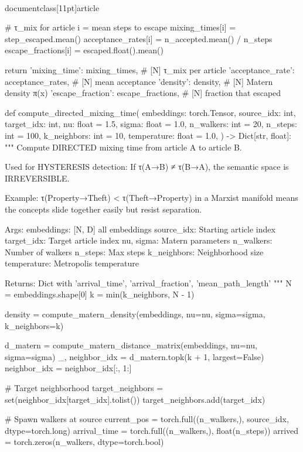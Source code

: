 \\documentclass[11pt]{article}
\begin{document}
\begin{CodeBlock}
        # τ_mix for article i = mean steps to escape
        mixing_times[i] = step_escaped.mean()
        acceptance_rates[i] = n_accepted.mean() / n_steps
        escape_fractions[i] = escaped.float().mean()

    return {
        'mixing_time': mixing_times,        # [N] τ_mix per article
        'acceptance_rate': acceptance_rates,  # [N] mean acceptance
        'density': density,                  # [N] Matern density π(x)
        'escape_fraction': escape_fractions, # [N] fraction that escaped
    }


def compute_directed_mixing_time(
    embeddings: torch.Tensor,
    source_idx: int,
    target_idx: int,
    nu: float = 1.5,
    sigma: float = 1.0,
    n_walkers: int = 20,
    n_steps: int = 100,
    k_neighbors: int = 10,
    temperature: float = 1.0,
) -> Dict[str, float]:
    """
    Compute DIRECTED mixing time from article A to article B.

    Used for HYSTERESIS detection:
    If τ(A→B) ≠ τ(B→A), the semantic space is IRREVERSIBLE.

    Example: τ(Property→Theft) < τ(Theft→Property) in a Marxist manifold
    means the concepts slide together easily but resist separation.

    Args:
        embeddings: [N, D] all embeddings
        source_idx: Starting article index
        target_idx: Target article index
        nu, sigma: Matern parameters
        n_walkers: Number of walkers
        n_steps: Max steps
        k_neighbors: Neighborhood size
        temperature: Metropolis temperature

    Returns:
        Dict with 'arrival_time', 'arrival_fraction', 'mean_path_length'
    """
    N = embeddings.shape[0]
    k = min(k_neighbors, N - 1)

    density = compute_matern_density(embeddings, nu=nu, sigma=sigma, k_neighbors=k)

    d_matern = compute_matern_distance_matrix(embeddings, nu=nu, sigma=sigma)
    _, neighbor_idx = d_matern.topk(k + 1, largest=False)
    neighbor_idx = neighbor_idx[:, 1:]

    # Target neighborhood
    target_neighbors = set(neighbor_idx[target_idx].tolist())
    target_neighbors.add(target_idx)

    # Spawn walkers at source
    current_pos = torch.full((n_walkers,), source_idx, dtype=torch.long)
    arrival_time = torch.full((n_walkers,), float(n_steps))
    arrived = torch.zeros(n_walkers, dtype=torch.bool)


\end{CodeBlock}
\end{document}
